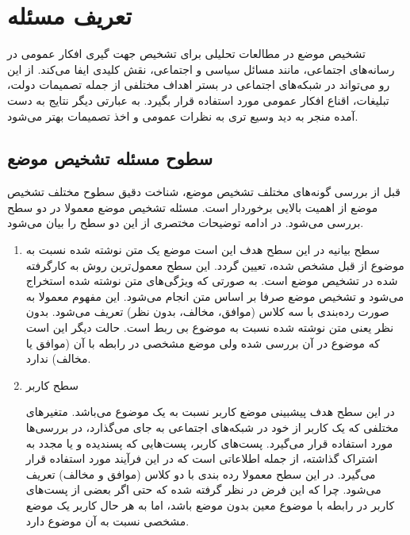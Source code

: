 \chapter{تعریف مسئله}
\thispagestyle{empty}

تشخیص موضع در مطالعات تحلیلی برای تشخیص جهت گیری افکار عمومی در رسانه‌های اجتماعی، مانند مسائل سیاسی و اجتماعی، نقش کلیدی ایفا می‌کند. از این رو می‌تواند در شبکە‌های اجتماعی در بستر اهداف مختلفی از جمله تصمیمات دولت، تبلیغات، اقناع افکار عمومی مورد استفاده قرار بگیرد. به عبارتی دیگر نتایج به دست آمده منجر به دید وسیع تری به نظرات عمومی و اخذ تصمیمات بهتر می‌شود.


\section{سطوح مسئله تشخیص موضع}\label{sec:stance-detection-level}
قبل از بررسی گونە‌های مختلف تشخیص موضع، شناخت دقیق سطوح مختلف تشخیص موضع از اهمیت
بالایی برخوردار است. مسئله تشخیص موضع معمولا در دو سطح بررسی می‌شود. در ادامه توضیحات
مختصری از این دو سطح را بیان می‌شود.
\begin{enumerate}
	\item 
	 سطح بیانیه
	\newline
در این سطح هدف این است موضع یک متن نوشته شده نسبت به موضوع از قبل مشخص شده،
تعیین گردد. این سطح معمول‌ترین روش به کارگرفته شده در تشخیص موضع است. به صورتی که
ویژگی‌‌های متن نوشته شده استخراج می‌شود و تشخیص موضع صرفا بر اساس متن انجام می‌شود. این مفهوم معمولا به صورت ردە‌بندی با سه کلاس (موافق، مخالف، بدون نظر) تعریف می‌شود.  بدون نظر یعنی متن نوشته شده نسبت به موضوع بی ربط است. حالت دیگر این است که موضوع در
آن بررسی شده ولی موضع مشخصی در رابطه با آن (موافق یا مخالف) ندارد.
	\item  سطح کاربر
	
در این سطح هدف پیشبینی موضع کاربر نسبت به یک موضوع می‌باشد. متغیرهای مختلفی که
یک کاربر از خود در شبکه‌‌های اجتماعی به جای می‌گذارد، در بررسی‌‌ها مورد استفاده قرار می‌گیرد.
پست‌های کاربر، پست‌هایی که پسندیده و یا مجدد به اشتراک گذاشته، از جمله اطلاعاتی‌ است که در این فرآیند مورد استفاده قرار می‌گیرد. در این سطح معمولا ردە بندی با دو کلاس (موافق و مخالف) تعریف می‌شود. چرا که این فرض در نظر گرفته شده که حتی اگر بعضی از پست‌های کاربر در رابطه با موضوع معین بدون موضع باشد، اما به هر حال کاربر یک موضع مشخصی نسبت به آن موضوع دارد.

\end{enumerate}

